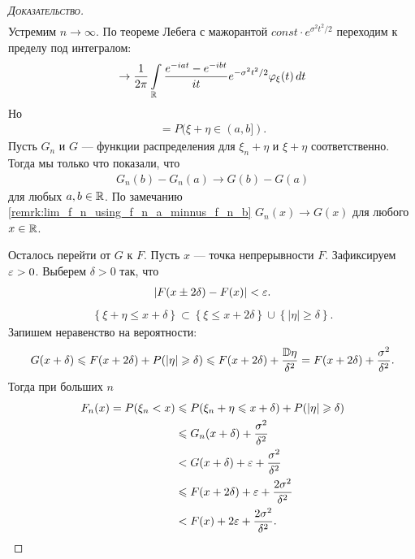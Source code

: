 \documentclass[../main.tex]{subfiles}
\begin{document}
\begin{proof}[\normalfont\textsc{Доказательство}]
\begin{align*}
 \end{align*} Устремим $ n \to \infty $. По теореме Лебега с мажорантой $const \cdot e^{\sigma^2t^2/2}$ переходим к пределу под интегралом:  
 \begin{align*}
	 \to \frac{1}{2\pi} \int\limits_{\mathbb{R}} \frac{e^{-iat}-e^{-ibt}}{it}  e^{-\sigma^{2}t^{2} / 2}\varphi_{\xi}(t)\,dt
 \end{align*} Но
 \begin{align*}
  = P(\xi+ \eta \in (a,b]).
 \end{align*} Пусть $ G_n $ и $ G $ --- функции распределения для $ \xi_n + \eta $ и $ \xi + \eta $ соответственно. Тогда мы только что показали, что
 \begin{align*}
  G_n(b) - G_n(a) \to G(b) - G(a)
 \end{align*} для любых $ a,b\in\mathbb{R} $. По замечанию \ref{remrk:lim_f_n_using_f_n_a_minnus_f_n_b} $ G_n(x) \to G(x) $ для любого $ x \in \mathbb{R} $.

 Осталось перейти от $ G $ к $ F $. Пусть $ x $ --- точка непрерывности $ F $. Зафиксируем $ \varepsilon  > 0 $. Выберем $ \delta > 0 $ так, что 
 \begin{align*}
  \left| F(x \pm 2\delta) - F(x) \right| < \varepsilon.
 \end{align*}
 \begin{align*}
  \left\{ \xi+\eta \leqslant x  + \delta \right\} \subset \left\{ \xi \leqslant x + 2\delta \right\} \cup \left\{ \left| \eta \right| \geqslant \delta \right\}.
 \end{align*} Запишем неравенство на вероятности:
 \begin{align*}
	 G(x+\delta) \leqslant F(x+2\delta) + P(\left| \eta \right| \geqslant \delta) \leqslant F(x+2\delta) + \frac{\mathbb D \eta}{\delta^{2}} = F(x + 2\delta) + \frac{\sigma^2}{\delta^2}. 
 \end{align*} 
 Тогда при больших $n$
 \begin{align*}
	 F_n(x) = P(\xi_n < x) &\leqslant P(\xi_n + \eta \leqslant x + \delta) + P(|\eta| \geqslant \delta) \\
												 &\leqslant G_n(x+\delta) + \frac{\sigma^{2}}{\delta^{2}} \\
												 &< G(x+\delta) + \varepsilon + \frac{\sigma^{2}}{\delta^{2}} \\
												 &\leqslant F(x+2\delta) + \varepsilon + \frac{2\sigma^{2}}{\delta^{2}} \\
												 &< F(x) + 2\varepsilon + \frac{2\sigma^{2}}{\delta^{2}}.
 \end{align*}


\end{proof}
\end{document}
